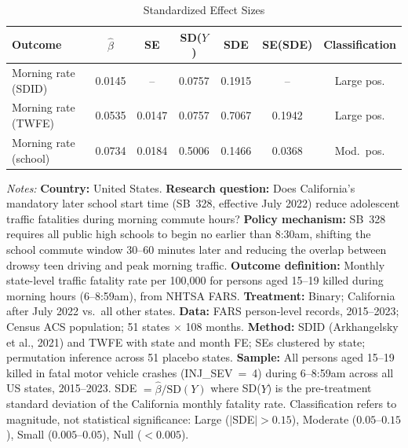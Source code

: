 \begin{table}[htbp]
\centering
\caption{Standardized Effect Sizes}
\label{tab:sde}
\begin{tabular}{lcccccc}
\toprule
Outcome & $\hat{\beta}$ & SE & SD($Y$) & SDE & SE(SDE) & Classification \\
\midrule
Morning rate (SDID) & 0.0145 & -- & 0.0757 & 0.1915 & -- & Large pos. \\
Morning rate (TWFE) & 0.0535 & 0.0147 & 0.0757 & 0.7067 & 0.1942 & Large pos. \\
Morning rate (school) & 0.0734 & 0.0184 & 0.5006 & 0.1466 & 0.0368 & Mod.\ pos. \\
\bottomrule
\end{tabular}
\par\vspace{0.5em}
\begin{minipage}{\textwidth}
\footnotesize
\textit{Notes:}
\textbf{Country:} United States.
\textbf{Research question:} Does California's mandatory later school start time (SB~328, effective July 2022) reduce adolescent traffic fatalities during morning commute hours?
\textbf{Policy mechanism:} SB~328 requires all public high schools to begin no earlier than 8:30am, shifting the school commute window 30--60 minutes later and reducing the overlap between drowsy teen driving and peak morning traffic.
\textbf{Outcome definition:} Monthly state-level traffic fatality rate per 100,000 for persons aged 15--19 killed during morning hours (6--8:59am), from NHTSA FARS.
\textbf{Treatment:} Binary; California after July 2022 vs.\ all other states.
\textbf{Data:} FARS person-level records, 2015--2023; Census ACS population; 51 states $\times$ 108 months.
\textbf{Method:} SDID (Arkhangelsky et al., 2021) and TWFE with state and month FE; SEs clustered by state; permutation inference across 51 placebo states.
\textbf{Sample:} All persons aged 15--19 killed in fatal motor vehicle crashes (INJ\_SEV~=~4) during 6--8:59am across all US states, 2015--2023.
SDE $= \hat{\beta} / \text{SD}(Y)$ where SD($Y$) is the pre-treatment standard deviation of the California monthly fatality rate.
Classification refers to magnitude, not statistical significance: Large ($|$SDE$| > 0.15$), Moderate ($0.05$--$0.15$), Small ($0.005$--$0.05$), Null ($< 0.005$).
\end{minipage}
\end{table}
